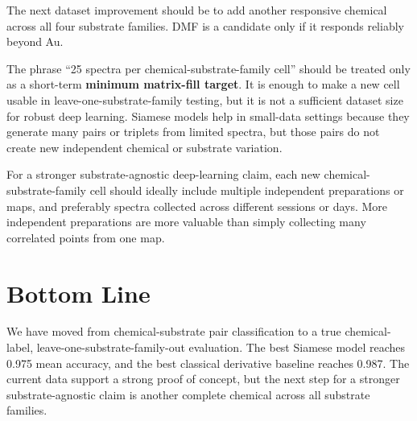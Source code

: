 \documentclass[11pt]{article}
\begin{document}
The next dataset improvement should be to add another responsive chemical across all four substrate families. DMF is a candidate only if it responds reliably beyond Au.

The phrase ``25 spectra per chemical-substrate-family cell'' should be treated only as a short-term \textbf{minimum matrix-fill target}. It is enough to make a new cell usable in leave-one-substrate-family testing, but it is not a sufficient dataset size for robust deep learning. Siamese models help in small-data settings because they generate many pairs or triplets from limited spectra, but those pairs do not create new independent chemical or substrate variation.

For a stronger substrate-agnostic deep-learning claim, each new chemical-substrate-family cell should ideally include multiple independent preparations or maps, and preferably spectra collected across different sessions or days. More independent preparations are more valuable than simply collecting many correlated points from one map.

\section*{Bottom Line}

We have moved from chemical-substrate pair classification to a true chemical-label, leave-one-substrate-family-out evaluation. The best Siamese model reaches 0.975 mean accuracy, and the best classical derivative baseline reaches 0.987. The current data support a strong proof of concept, but the next step for a stronger substrate-agnostic claim is another complete chemical across all substrate families.
\end{document}
